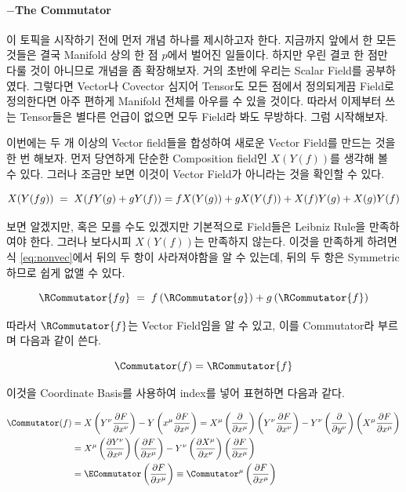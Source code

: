 \documentclass[paper=a4, fontsize=11pt]{scrartcl} %
\numberwithin{equation}{section} %
\numberwithin{figure}{section} %
\numberwithin{table}{section} %
\theoremstyle{plain}
\newcommand{\Hs}{\hspace{0.1cm}}
\newcommand{\HS}{\hspace{0.5cm}}
\newcommand{\PD}[2]{\frac{\partial #1}{\partial #2}}
\newcommand{\BKS}[1]{\left( #1 \right)}
\newcommand{\Basisnp}[1][\mu]{\BKS{\PD{}{x^{#1}}}}
\begin{document}
\pagebreak

\paragraph{$-$The Commutator} 이 토픽을 시작하기 전에 먼저 개념 하나를 제시하고자 한다. 지금까지 앞에서 한 모든 것들은 결국 Manifold 상의 한 점 $p$에서 벌어진 일들이다.
하지만 우린 결코 한 점만 다룰 것이 아니므로 개념을 좀 확장해보자. 거의 초반에 우리는 Scalar Field를 공부하였다. 그렇다면 Vector나 Covector 심지어 Tensor도 모든 점에서 정의되게끔
Field로 정의한다면 아주 편하게 Manifold 전체를 아우를 수 있을 것이다. 따라서 이제부터 쓰는 Tensor들은 별다른 언급이 없으면 모두 Field라 봐도 무방하다. 그럼 시작해보자.

\HS 이번에는 두 개 이상의 Vector field들을 합성하여 새로운 Vector Field를 만드는 것을 한 번 해보자. 먼저 당연하게 단순한 Composition field인 $X(Y(f))$를 생각해 볼 수 있다.
그러나 조금만 보면 이것이 Vector Field가 아니라는 것을 확인할 수 있다.

\begin{equation}
\label{eq:nonvec}
 X(Y(fg))\Hs =\Hs X(fY(g)+gY(f)) = fX(Y(g)) + gX(Y(f)) + X(f)Y(g) + X(g)Y(f)
\end{equation}

보면 알겠지만, 혹은 모를 수도 있겠지만 기본적으로 Field들은 Leibniz Rule\footnotemark 을 만족하여야 한다. 그러나 보다시피 $X(Y(f))$는 만족하지 않는다. 
이것을 만족하게 하려면 식 \ref{eq:nonvec}에서 뒤의 두 항이 사라져야함을 알 수 있는데, 뒤의 두 항은 Symmetric하므로 쉽게 없앨 수 있다.

\begin{equation}
 \RCommutator{fg}\Hs=\Hs f\BKS{\RCommutator{g}} + g\BKS{\RCommutator{f}}
\end{equation}

따라서 $\RCommutator{f}$는 Vector Field임을 알 수 있고, 이를 Commutator라 부르며 다음과 같이 쓴다.

\begin{equation}
 \Commutator(f) = \RCommutator{f}
\end{equation}

이것을 Coordinate Basis를 사용하여 index를 넣어 표현하면 다음과 같다.

\begin{align}
 \begin{split}
  \Commutator(f) & = X\BKS{Y^\nu \PD{F}{x^\nu}} - Y\BKS{x^\mu \PD{F}{x^\mu}} = X^\mu \Basisnp \BKS{Y^{\nu}\PD{F}{x^\nu}}-Y^\nu \BKS{\PD{}{y^\nu}}\BKS{X^\mu \PD{F}{x^\mu}} \\
                 & = X^\mu\BKS{\PD{Y^\nu}{x^\mu}}\BKS{\PD{F}{x^\mu}} - Y^\nu\BKS{\PD{X^\mu}{x^\nu}}\BKS{\PD{F}{x^\mu}} \\
                 & = \ECommutator \BKS{\PD{F}{x^\mu}} \equiv \Commutator^\mu \BKS{\PD{F}{x^\mu}}
 \end{split}
\end{align}
\end{document}
